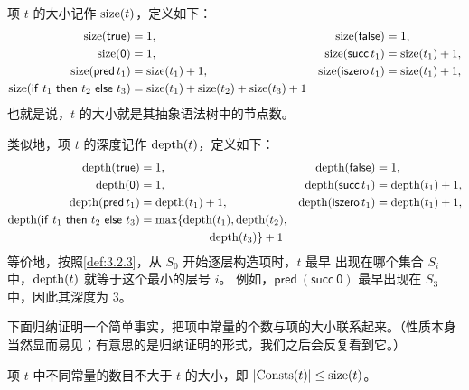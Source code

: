 \begin{definition}
\label{def:3.3.2}
项 \(t\) 的大小记作 \(\operatorname{size}(t)\)，定义如下：
\[
\begin{aligned}
 \operatorname{size}(\mathsf{true})&=1,&
 \operatorname{size}(\mathsf{false})&=1,\\
 \operatorname{size}(\mathsf{0})&=1,&
 \operatorname{size}(\mathsf{succ}\,t_1)&=\operatorname{size}(t_1)+1,\\
 \operatorname{size}(\mathsf{pred}\,t_1)&=\operatorname{size}(t_1)+1,&
 \operatorname{size}(\mathsf{iszero}\,t_1)&=\operatorname{size}(t_1)+1,\\
 \operatorname{size}(\mathsf{if}\ t_1\ \mathsf{then}\ t_2\ \mathsf{else}\ t_3)
   &=\operatorname{size}(t_1)+\operatorname{size}(t_2)+\operatorname{size}(t_3)+1
\end{aligned}
\]
也就是说，\(t\) 的大小就是其抽象语法树中的节点数。

类似地，项 \(t\) 的深度记作 \(\operatorname{depth}(t)\)，定义如下：
\[
\begin{aligned}
 \operatorname{depth}(\mathsf{true})&=1,&
 \operatorname{depth}(\mathsf{false})&=1,\\
 \operatorname{depth}(\mathsf{0})&=1,&
 \operatorname{depth}(\mathsf{succ}\,t_1)&=\operatorname{depth}(t_1)+1,\\
 \operatorname{depth}(\mathsf{pred}\,t_1)&=\operatorname{depth}(t_1)+1,&
 \operatorname{depth}(\mathsf{iszero}\,t_1)&=\operatorname{depth}(t_1)+1,\\
 \operatorname{depth}(\mathsf{if}\ t_1\ \mathsf{then}\ t_2\ \mathsf{else}\ t_3)
   &=\max\{\operatorname{depth}(t_1),\operatorname{depth}(t_2),\\
   &\hspace{5.8em}\operatorname{depth}(t_3)\}+1
\end{aligned}
\]
等价地，按照\cref{def:3.2.3}，从 \(S_0\) 开始逐层构造项时，\(t\) 最早
出现在哪个集合 \(S_i\) 中，\(\operatorname{depth}(t)\) 就等于这个最小的层号 \(i\)。
例如，\(\mathsf{pred\ (succ\ 0)}\) 最早出现在 \(S_3\) 中，因此其深度为
\(3\)。
\end{definition}

下面归纳证明一个简单事实，把项中常量的个数与项的大小联系起来。（性质本身
当然显而易见；有意思的是归纳证明的形式，我们之后会反复看到它。）

\begin{lemma}
\label{lem:3.3.3}
项 \(t\) 中不同常量的数目不大于 \(t\) 的大小，即
\(\lvert\operatorname{Consts}(t)\rvert\leq\operatorname{size}(t)\)。
\end{lemma}

